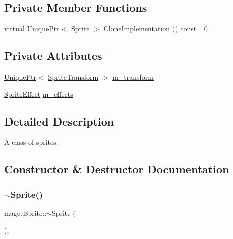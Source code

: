\subsection*{Private Member Functions}
\begin{DoxyCompactItemize}
\item 
virtual \hyperlink{namespacemage_a3316d7143a973e37adf1110f2e80ca31}{Unique\+Ptr}$<$ \hyperlink{classmage_1_1_sprite}{Sprite} $>$ \hyperlink{classmage_1_1_sprite_a214890d7da493bccadb2327b8c7ffb09}{Clone\+Implementation} () const =0
\end{DoxyCompactItemize}
\subsection*{Private Attributes}
\begin{DoxyCompactItemize}
\item 
\hyperlink{namespacemage_a3316d7143a973e37adf1110f2e80ca31}{Unique\+Ptr}$<$ \hyperlink{structmage_1_1_sprite_transform}{Sprite\+Transform} $>$ \hyperlink{classmage_1_1_sprite_ae9907dd9d43fe2ce025bbc86b06dc7a3}{m\+\_\+transform}
\item 
\hyperlink{namespacemage_a9cfe18123066ba4236f548f9de75d881}{Sprite\+Effect} \hyperlink{classmage_1_1_sprite_a87a51b2b131c28bad75768d14defa3c1}{m\+\_\+effects}
\end{DoxyCompactItemize}


\subsection{Detailed Description}
A class of sprites. 

\subsection{Constructor \& Destructor Documentation}
\hypertarget{classmage_1_1_sprite_a0f184574f9c035d6fbb239c1868aa670}{}\label{classmage_1_1_sprite_a0f184574f9c035d6fbb239c1868aa670} 
\subsubsection{\texorpdfstring{$\sim$\+Sprite()}{~Sprite()}}
{\footnotesize\ttfamily mage\+::\+Sprite\+::$\sim$\+Sprite (\begin{DoxyParamCaption}{ }\end{DoxyParamCaption})\hspace{0.3cm}{\ttfamily [virtual]}, {\ttfamily [default]}}

